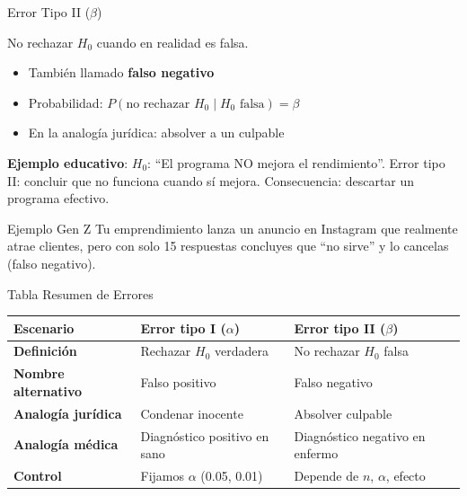 \documentclass[aspectratio=169, 11pt]{beamer}
\begin{document}
\begin{frame}{Error Tipo II ($\beta$)}
\begin{definition}
\alert{No rechazar} $H_0$ cuando en realidad es \alert{falsa}.
\end{definition}

\vspace{0.2cm}
\begin{itemize}
  \item También llamado \textbf{falso negativo}
  \item Probabilidad: $P(\text{no rechazar } H_0 \mid H_0 \text{ falsa}) = \beta$
  \item En la analogía jurídica: absolver a un culpable
\end{itemize}

\vspace{0.2cm}
\textbf{Ejemplo educativo}: $H_0$: ``El programa NO mejora el rendimiento''. Error tipo II: concluir que no funciona cuando s\'i mejora. Consecuencia: descartar un programa efectivo.

\begin{exampleblock}{Ejemplo Gen Z}
Tu emprendimiento lanza un anuncio en Instagram que realmente atrae clientes, pero con solo 15 respuestas concluyes que ``no sirve'' y lo cancelas (falso negativo).
\end{exampleblock}
\end{frame}

\begin{frame}{Tabla Resumen de Errores}
\begin{table}
\centering
\small
\begin{tabular}{p{2.8cm}p{3.8cm}p{3.8cm}}
\toprule
\textbf{Escenario} & \textbf{Error tipo I ($\alpha$)} & \textbf{Error tipo II ($\beta$)} \\
\midrule
\textbf{Definición} & Rechazar $H_0$ verdadera & No rechazar $H_0$ falsa \\[0.15cm]
\textbf{Nombre alternativo} & Falso positivo & Falso negativo \\[0.15cm]
\textbf{Analogía jurídica} & Condenar inocente & Absolver culpable \\[0.15cm]
\textbf{Analogía médica} & Diagnóstico positivo en sano & Diagnóstico negativo en enfermo \\[0.15cm]
\textbf{Control} & Fijamos $\alpha$ (0.05, 0.01) & Depende de $n$, $\alpha$, efecto \\
\bottomrule
\end{tabular}
\end{table}
\end{frame}
\end{document}
